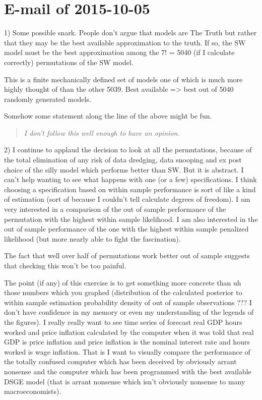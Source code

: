 \documentclass{article}
\begin{document}
\section{E-mail of 2015-10-05}

1) Some possible snark.  People don't argue that models are The Truth but rather that they may be the best available approximation to the truth.  If so, the SW model must be the best approximation among the 7! = 5040 (if I calculate correctly) permutations of the SW model.  

This is a finite mechanically defined set of models one of which is much more highly thought of than the other 5039.  Best available => best out of 5040  randomly generated models. 

Somehow some statement along the line of the above might be fun.

\begin{quotation} {\em I don't follow this well enough to have an opinion.}
\end{quotation}

2) I continue to applaud the decision to look at all the permutations, because of the total elimination of any risk of data dredging, data snooping and ex post choice of the silly model which performs better than SW.  But it is abstract.  I can't help wanting to see what happens with one (or a few) specifications.  I think choosing a specification based on within sample performance is sort of like a kind of estimation (sort of because I couldn't tell calculate degrees of freedom).  I am very interested in a comparison of the out of sample performance of the permutation with the highest within sample likelihood.  I am also interested in the out of sample performance of the one with the highest within sample penalized likelihood (but more nearly able to fight the fascination).

The fact that well over half of permutations work better out of sample suggests that checking this won't be too painful.  

The point (if any) of this exercise is to get something more concrete than uh those numbers which you graphed (distribution of the calculated posterior to within sample estimation probability density of out of sample observations ??? I don't have confidence in my memory or even my understanding of the legends of the figures).  I really really want to see time series of forecast real GDP hours worked and price inflation calculated by the computer when it was told that real GDP is price inflation and price inflation is the nominal interest rate and hours worked is wage inflation.  That is I want to visually compare the performance of the totally confused computer which has been deceived by obviously arrant nonsense and the computer which has been programmed with the best available DSGE model (that is arrant nonsense which isn't obviously nonsense to many macroeconomists).
\end{document}
